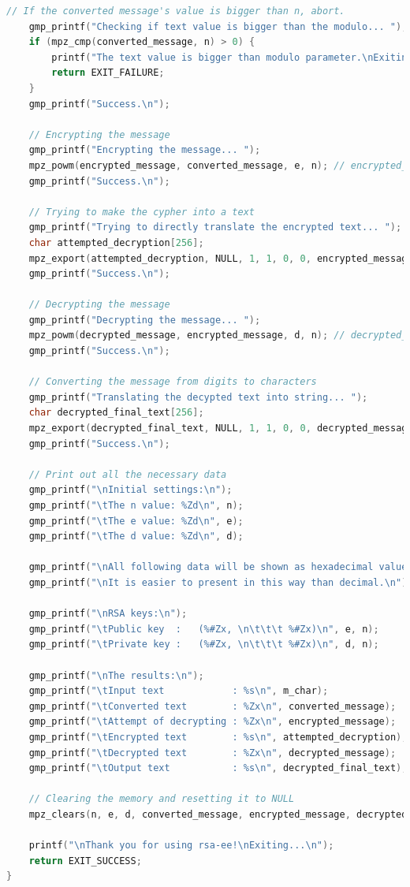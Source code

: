 \documentclass[a4paper, 12pt]{article}
\begin{document}
\begin{lstlisting}[language=C, caption=Source Code of rsa.c]
    // If the converted message's value is bigger than n, abort.
    gmp_printf("Checking if text value is bigger than the modulo... ");
    if (mpz_cmp(converted_message, n) > 0) {
        printf("The text value is bigger than modulo parameter.\nExiting...\n");
        return EXIT_FAILURE;
    }
    gmp_printf("Success.\n");
    
    // Encrypting the message
    gmp_printf("Encrypting the message... ");
    mpz_powm(encrypted_message, converted_message, e, n); // encrypted_message = pow(m, e) % n
    gmp_printf("Success.\n");
    
    // Trying to make the cypher into a text
    gmp_printf("Trying to directly translate the encrypted text... ");
    char attempted_decryption[256];
    mpz_export(attempted_decryption, NULL, 1, 1, 0, 0, encrypted_message);
    gmp_printf("Success.\n");
    
    // Decrypting the message
    gmp_printf("Decrypting the message... ");
    mpz_powm(decrypted_message, encrypted_message, d, n); // decrypted_message = pow(encrypted_message, d) % n
    gmp_printf("Success.\n");
    
    // Converting the message from digits to characters
    gmp_printf("Translating the decypted text into string... ");
    char decrypted_final_text[256];
    mpz_export(decrypted_final_text, NULL, 1, 1, 0, 0, decrypted_message);
    gmp_printf("Success.\n");
    
    // Print out all the necessary data 
    gmp_printf("\nInitial settings:\n");
    gmp_printf("\tThe n value: %Zd\n", n);
    gmp_printf("\tThe e value: %Zd\n", e);
    gmp_printf("\tThe d value: %Zd\n", d);
    
    gmp_printf("\nAll following data will be shown as hexadecimal values.");
    gmp_printf("\nIt is easier to present in this way than decimal.\n");
    
    gmp_printf("\nRSA keys:\n");
    gmp_printf("\tPublic key  :   (%#Zx, \n\t\t\t %#Zx)\n", e, n);
    gmp_printf("\tPrivate key :   (%#Zx, \n\t\t\t %#Zx)\n", d, n);
    
    gmp_printf("\nThe results:\n");
    gmp_printf("\tInput text            : %s\n", m_char);
    gmp_printf("\tConverted text        : %Zx\n", converted_message);
    gmp_printf("\tAttempt of decrypting : %Zx\n", encrypted_message);
    gmp_printf("\tEncrypted text        : %s\n", attempted_decryption);
    gmp_printf("\tDecrypted text        : %Zx\n", decrypted_message);
    gmp_printf("\tOutput text           : %s\n", decrypted_final_text);
    
    // Clearing the memory and resetting it to NULL
    mpz_clears(n, e, d, converted_message, encrypted_message, decrypted_message, NULL);
    
    printf("\nThank you for using rsa-ee!\nExiting...\n");
    return EXIT_SUCCESS;
}
\end{lstlisting}
\end{document}
